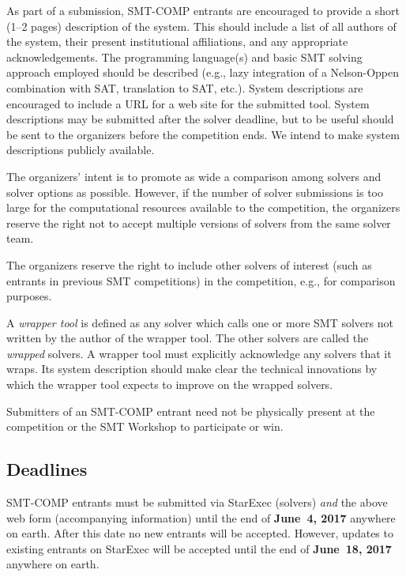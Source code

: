 \documentclass[12pt]{article}
\begin{document}
%
As part of a submission, SMT-COMP entrants are encouraged to provide a
short (1--2 pages) description of the system.  This should include a
list of all authors of the system, their present institutional
affiliations, and any appropriate acknowledgements.  The programming
language(s) and basic SMT solving approach employed should be
described (e.g., lazy integration of a Nelson-Oppen combination with
SAT, translation to SAT, etc.).  System descriptions are encouraged to
include a URL for a web site for the submitted tool.  System
descriptions may be submitted after the solver deadline, but to be
useful should be sent to the organizers before the competition ends.
We intend to make system descriptions publicly available.

%
The organizers' intent is to promote as wide a comparison among
solvers and solver options as possible.  However, if the number of
solver submissions is too large for the computational resources
available to the competition, the organizers reserve the right not to
accept multiple versions of solvers from the same solver team.

%
The organizers reserve the right to include other solvers of interest
(such as entrants in previous SMT competitions) in the competition,
e.g., for comparison purposes.

%
A \emph{wrapper tool} is defined as any solver which calls one or more
SMT solvers not written by the author of the wrapper tool.  The other
solvers are called the \emph{wrapped} solvers.  A wrapper tool must
explicitly acknowledge any solvers that it wraps.  Its system
description should make clear the technical innovations by which the
wrapper tool expects to improve on the wrapped solvers.

%
Submitters of an SMT-COMP entrant need not be physically present at
the competition or the SMT Workshop to participate or win.


\subsection*{Deadlines}

SMT-COMP entrants must be submitted via StarExec (solvers) \emph{and}
the above web form (accompanying information) until the end of {\bf
  June~4, 2017} anywhere on earth.  After this date no new entrants
will be accepted.  However, updates to existing entrants on StarExec
will be accepted until the end of {\bf June~18, 2017} anywhere on
earth.
\end{document}
